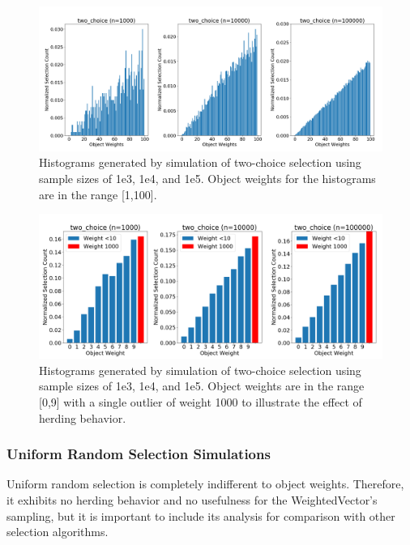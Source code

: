 \documentclass[12pt]{article}
\begin{document}
    \begin{figure}[h]
      \centering
      \includegraphics[scale=0.30]{images/herding_two_choice.png} 
      \caption{Histograms generated by simulation of two-choice selection
               using sample sizes of 1e3, 1e4, and 1e5. Object weights
               for the histograms are in the range [1,100].}
      \label{fig:herding_two_choice}
    \end{figure}

    \begin{figure}[h]
      \centering
      \includegraphics[scale=0.30]{images/pathological_two_choice.png} 
      \caption{Histograms generated by simulation of two-choice selection
               using sample sizes of 1e3, 1e4, and 1e5. Object weights are in
               the range [0,9] with a single outlier of weight 1000 to
               illustrate the effect of herding behavior.}
      \label{fig:pathological_two_choice}
    \end{figure}

    \subsubsection{Uniform Random Selection Simulations}
    Uniform random selection is completely indifferent to object weights.
    Therefore, it exhibits no herding behavior and no usefulness for the
    WeightedVector's sampling, but it is important to include its analysis for
    comparison with other selection algorithms.
\end{document}
